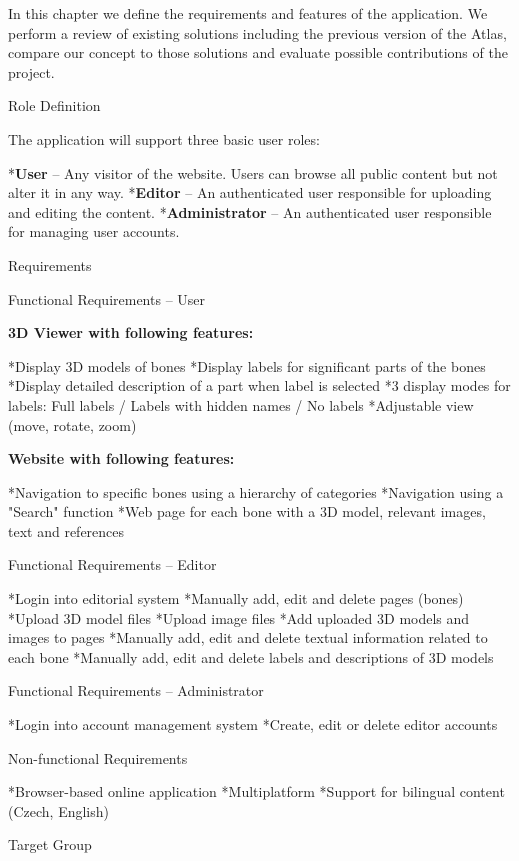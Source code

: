 In this chapter we define the requirements and features of the application. We perform a review of existing solutions including the previous version of the Atlas, compare our concept to those solutions and evaluate possible contributions of the project.

\sec Role Definition

The application will support three basic user roles:

\begitems
*{\bf User} -- Any visitor of the website. Users can browse all public content but not alter it in any way.
*{\bf Editor} -- An authenticated user responsible for uploading and editing the content.
*{\bf Administrator} -- An authenticated user responsible for managing user accounts.
\enditems

\sec Requirements

\secc Functional Requirements -- User

\vskip 10pt
{\bf 3D Viewer with following features:}

\begitems
*Display 3D models of bones
*Display labels for significant parts of the bones
*Display detailed description of a part when label is selected
*3 display modes for labels: Full labels / Labels with hidden names / No labels
*Adjustable view (move, rotate, zoom)
\enditems

\vskip 10pt
{\bf Website with following features:}

\begitems
*Navigation to specific bones using a hierarchy of categories
*Navigation using a "Search" function
*Web page for each bone with a 3D model, relevant images, text and references
\enditems

\secc Functional Requirements -- Editor

\begitems
*Login into editorial system
*Manually add, edit and delete pages (bones)
*Upload 3D model files
*Upload image files
*Add uploaded 3D models and images to pages
*Manually add, edit and delete textual information related to each bone
*Manually add, edit and delete labels and descriptions of 3D models
\enditems

\secc Functional Requirements -- Administrator

\begitems
*Login into account management system
*Create, edit or delete editor accounts
\enditems

\secc Non-functional Requirements

\begitems
*Browser-based online application
*Multiplatform
*Support for bilingual content (Czech, English)
\enditems

\sec Target Group

